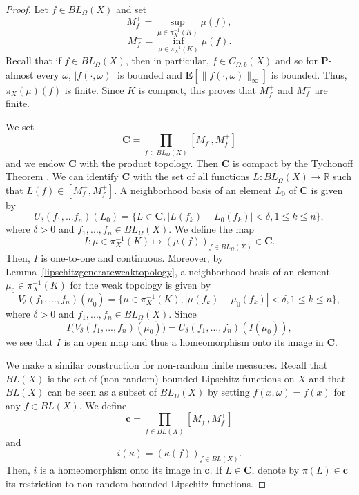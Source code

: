 \documentclass{amsart}
\theoremstyle{definition}
\theoremstyle{remark}
\begin{document}
\begin{proof}
Let $f\in BL_\Omega(X)$ and set
$$M_f^+=\sup_{\mu\in \pi_X^{-1}(K)}\mu(f),$$
$$M_f^-=\inf_{\mu\in \pi_X^{-1}(K)}\mu(f).$$
Recall that if $f\in BL_\Omega(X)$, then in particular, $f\in C_{\Omega,b}(X)$ and so for $\mathbf P$-almost every $\omega$, $|f(\cdot,\omega)|$ is bounded and
$\mathbf E[\|f(\cdot,\omega)\|_\infty]$ is bounded.
Thus, $\pi_X(\mu)(f)$ is finite.
Since $K$ is compact, this proves that $M_f^+$ and $M_f^-$ are finite.

We set
$$\mathbf C=\prod_{f\in BL_\Omega(X)}[M_f^-,M_f^+]$$
and we endow $\mathbf C$ with the product topology.
Then $\mathbf C$ is compact by the Tychonoff Theorem \cite[Theorem~2.61]{AliprantisBorder}.
We can identify $\mathbf C$ with the set of all functions $L:BL_\Omega(X)\to \mathbb R$ such that $L(f)\in [M_f^-,M_f^+]$.
A neighborhood basis of an element $L_0$ of $\mathbf C$ is given by
$$U_{\delta}(f_1,...f_n)(L_0)=\{L\in \mathbf C,|L(f_k)-L_0(f_k)|<\delta,1\leq k\leq n\},$$
where $\delta>0$ and $f_1,...,f_n\in BL_\Omega(X)$.
We define the map
$$I:\mu\in \pi_X^{-1}(K)\mapsto (\mu(f))_{f\in BL_\Omega(X)}\in \mathbf C.$$
Then, $I$ is one-to-one and continuous.
Moreover, by Lemma~\ref{lipschitzgenerateweaktopology}, a neighborhood basis of an element $\mu_0\in \pi_X^{-1}(K)$ for the weak topology is given by
$$V_\delta(f_1,...,f_n)(\mu_0)=\{\mu \in \pi_X^{-1}(K), |\mu(f_k)-\mu_0(f_k)|<\delta,1\leq k\leq n\},$$
where $\delta>0$ and $f_1,...,f_n\in BL_\Omega(X)$.
Since
$$I\big (V_\delta(f_1,...,f_n)(\mu_0)\big)=U_\delta(f_1,...,f_n)(I(\mu_0)),$$
we see that $I$ is an open map and thus a homeomorphism onto its image in $\mathbf C$.

We make a similar construction for non-random finite measures.
Recall that $BL(X)$ is the set of (non-random) bounded Lipschitz functions on $X$ and that $BL(X)$ can be seen as a subset of $BL_\Omega(X)$ by setting $f(x,\omega)=f(x)$ for any $f\in BL(X)$.
We define
$$\mathbf c=\prod_{f\in BL(X)}[M_f^-,M_f^+]$$
and
$$i(\kappa)=(\kappa(f))_{f\in BL(X)}.$$
Then, $i$ is a homeomorphism onto its image in $\mathbf c$.
If $L\in \mathbf C$, denote by $\pi(L)\in \mathbf c$ its restriction to non-random bounded Lipschitz functions.


\end{proof}
\end{document}

